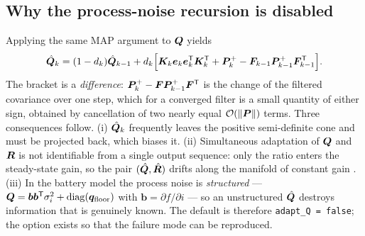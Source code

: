 \subsection{Why the process-noise recursion is disabled}
Applying the same MAP argument to $\bm{Q}$ yields \cite{sagehusa1969}
\begin{equation}
\hat{\bm{Q}}_k = (1-d_k)\hat{\bm{Q}}_{k-1} + d_k\Big[\bm{K}_k\bm{e}_k\bm{e}_k^{\mathsf{T}}\bm{K}_k^{\mathsf{T}} + \bm{P}^{+}_k - \bm{F}_{k-1}\bm{P}^{+}_{k-1}\bm{F}_{k-1}^{\mathsf{T}}\Big].
\label{eq:sh:Qrec}
\end{equation}
The bracket is a \emph{difference}: $\bm{P}^{+}_k-\bm{F}\bm{P}^{+}_{k-1}\bm{F}^{\mathsf{T}}$ is the change of the filtered
covariance over one step, which for a converged filter is a small quantity of either sign, obtained
by cancellation of two nearly equal $\mathcal{O}(\|\bm{P}\|)$ terms.  Three consequences follow.  (i)
$\hat{\bm{Q}}_k$ frequently leaves the positive semi-definite cone and must be projected back, which
biases it.  (ii) Simultaneous adaptation of $\bm{Q}$ and $\bm{R}$ is not identifiable from a single
output sequence: only the ratio enters the steady-state gain, so the pair $(\hat{\bm{Q}},\hat{\bm{R}})$
drifts along the manifold of constant gain \cite{mehra1970}.  (iii) In the battery model the
process noise is \emph{structured} --- $\bm{Q} = \bm{b}\bm{b}^{\mathsf{T}}\sigma_i^2 + \operatorname{diag}(\bm{q}_{\text{floor}})$
with $\bm b = \partial f/\partial i$ --- so an unstructured $\hat{\bm{Q}}$ destroys information that is
genuinely known.  The default is therefore \texttt{adapt\_Q = false}; the option exists so that the
failure mode can be reproduced.

